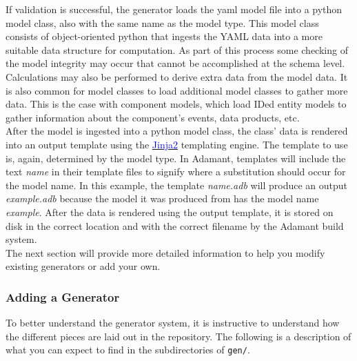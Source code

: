 If validation is successful, the generator loads the yaml model file into a python model class, also with the same name as the model type. This model class consists of object-oriented python that ingests the YAML data into a more suitable data structure for computation. As part of this process some checking of the model integrity may occur that cannot be accomplished at the schema level. Calculations may also be performed to derive extra data from the model data. It is also common for model classes to load additional model classes to gather more data. This is the case with component models, which load IDed entity models to gather information about the component's events, data products, etc. \\

After the model is ingested into a python model class, the class' data is rendered into an output template using the \href{http://jinja.pocoo.org}{\textcolor{blue}{Jinja2}} templating engine. The template to use is, again, determined by the model type. In Adamant, templates will include the text \textit{name} in their template files to signify where a substitution should occur for the model name. In this example, the template \textit{name.adb} will produce an output \textit{example.adb} because the model it was produced from has the model name \textit{example}. After the data is rendered using the output template, it is stored on disk in the correct location and with the correct filename by the Adamant build system. \\

The next section will provide more detailed information to help you modify existing generators or add your own.

\subsubsection{Adding a Generator} \label{Adding Generators}

To better understand the generator system, it is instructive to understand how the different pieces are laid out in the repository. The following is a description of what you can expect to find in the subdirectories of \texttt{gen/}.

